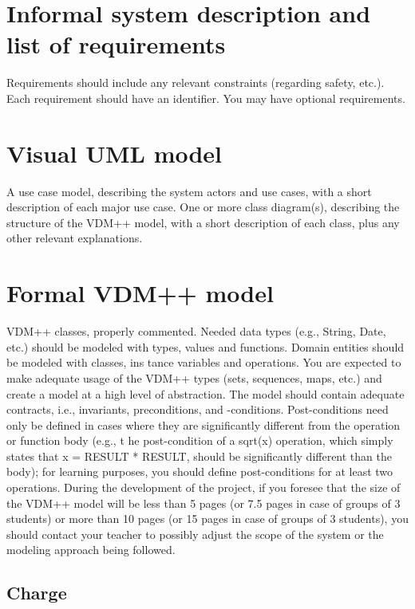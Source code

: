 \documentclass[a4paper]{article}
\begin{document}

\newpage
\tableofcontents
\newpage

\section{Informal system description and list of requirements}
Requirements should include any relevant constraints (regarding safety, etc.). 
Each requirement should have an identifier. 
You may have optional requirements. 
\section{Visual UML model}
A use case model, describing the system actors and 
use cases, with a short description 
of each major use case. 
One or more class diagram(s), describing the structure of the VDM++ model, with a 
short description of each class, plus any other relevant explanations. 
\section{Formal VDM++ model}
VDM++ classes, properly commented. 
Needed data types (e.g., String, Date, etc.) should be modeled with types, values and 
functions. 
Domain entities should be modeled with classes, ins
tance variables and operations. 
You are expected to make adequate usage of the VDM++ types (sets, sequences, maps, etc.) and create a model at a high level of abstraction. 
The model should contain adequate contracts, i.e., 
invariants, preconditions, and -conditions. Post-conditions need only be defined in cases where they are significantly different from the operation or function body (e.g., t
he post-condition of a sqrt(x) operation, which simply states that x = RESULT * RESULT, should be significantly different than the body); for learning purposes, you should define post-conditions for at least two operations. 
During the development of the project, if you foresee that the size of the VDM++ model 
will be less than 5 pages (or 7.5 pages in case of 
groups of 3 students) or more than 10 
pages (or 15 pages in case of groups of 3 students), you should contact your teacher to 
possibly adjust the scope of the system or the modeling approach being followed. 
\subsection{Charge}

\end{document}

